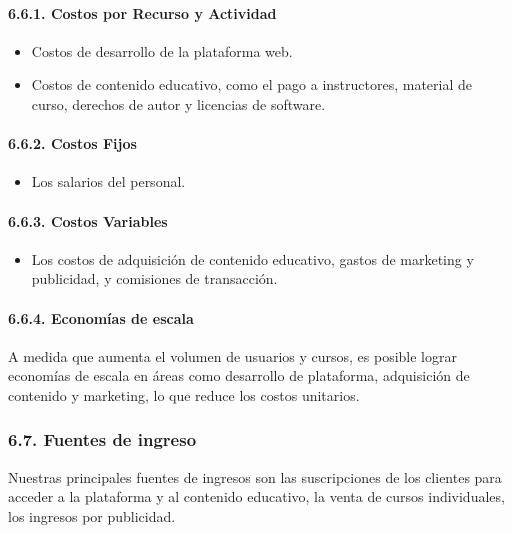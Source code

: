\documentclass[
]{article}
\providecommand{\tightlist}{%
  \setlength{\itemsep}{0pt}\setlength{\parskip}{0pt}}
\begin{document}
\paragraph{6.6.1. Costos por Recurso y
Actividad}\label{costos-por-recurso-y-actividad}

\begin{itemize}
\tightlist
\item
  Costos de desarrollo de la plataforma web.
\item
  Costos de contenido educativo, como el pago a instructores, material
  de curso, derechos de autor y licencias de software.
\end{itemize}

\paragraph{6.6.2. Costos Fijos}\label{costos-fijos}

\begin{itemize}
\tightlist
\item
  Los salarios del personal.
\end{itemize}

\paragraph{6.6.3. Costos Variables}\label{costos-variables}

\begin{itemize}
\tightlist
\item
  Los costos de adquisición de contenido educativo, gastos de marketing
  y publicidad, y comisiones de transacción.
\end{itemize}

\paragraph{6.6.4. Economías de escala}\label{economuxedas-de-escala}

A medida que aumenta el volumen de usuarios y cursos, es posible lograr
economías de escala en áreas como desarrollo de plataforma, adquisición
de contenido y marketing, lo que reduce los costos unitarios.

\subsubsection{6.7. Fuentes de ingreso}\label{fuentes-de-ingreso}

Nuestras principales fuentes de ingresos son las suscripciones de los
clientes para acceder a la plataforma y al contenido educativo, la venta
de cursos individuales, los ingresos por publicidad.
\end{document}
